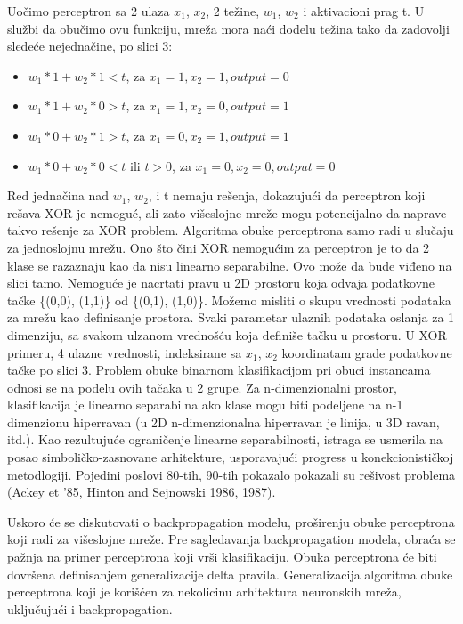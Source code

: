 \documentclass[fontsize=11bp, paper=a4]{scrarticle}
\begin{document}
Uočimo perceptron sa 2 ulaza $x_1$, $x_2$, 2 težine, $w_1$, $w_2$ i aktivacioni prag t. U službi da obučimo ovu funkciju, mreža mora naći dodelu težina tako da zadovolji sledeće nejednačine, po slici 3:
\begin{itemize}
    \item $w_1 * 1 + w_2 * 1 < t$, za $x_1 = 1, x_2 = 1, output = 0$
    \item $w_1 * 1 + w_2 * 0 > t$, za $x_1 = 1, x_2 = 0, output = 1$
    \item $w_1 * 0 + w_2 * 1 > t$, za $x_1 = 0, x_2 = 1, output = 1$
    \item $w_1 * 0 + w_2 * 0 < t$ ili $t > 0$, za $x_1 = 0, x_2 = 0, output = 0$
\end{itemize}
Red jednačina nad $w_1$, $w_2$, i  t nemaju rešenja, dokazujući da perceptron koji rešava XOR je nemoguć, ali zato višeslojne mreže mogu potencijalno da naprave takvo rešenje za XOR problem. Algoritma obuke perceptrona samo radi u slučaju za jednoslojnu mrežu. Ono što čini XOR nemogućim za perceptron je to da 2 klase se razaznaju kao da nisu linearno separabilne. Ovo može da bude viđeno na slici tamo. Nemoguće je nacrtati pravu u 2D prostoru koja odvaja podatkovne tačke \{(0,0), (1,1)\} od \{(0,1), (1,0)\}. Možemo misliti o skupu vrednosti podataka za mrežu kao definisanje prostora. Svaki parametar ulaznih podataka oslanja za 1 dimenziju, sa svakom ulzanom vrednošću koja definiše tačku u prostoru. U XOR primeru, 4 ulazne vrednosti, indeksirane sa $x_1$, $x_2$ koordinatam grade podatkovne tačke po slici 3. Problem obuke binarnom klasifikacijom pri obuci instancama odnosi se na podelu ovih tačaka u 2 grupe. Za n-dimenzionalni prostor, klasifikacija je linearno separabilna ako klase mogu biti podeljene na n-1 dimenzionu hiperravan (u 2D n-dimenzionalna hiperravan je linija, u 3D ravan, itd.). Kao rezultujuće ograničenje linearne separabilnosti, istraga se usmerila na posao simboličko-zasnovane arhitekture, usporavajući progress u konekcionističkoj metodlogiji. Pojedini poslovi 80-tih, 90-tih pokazalo pokazali su rešivost problema (Ackey et '85, Hinton and Sejnowski 1986, 1987).

Uskoro će se diskutovati o backpropagation modelu, proširenju obuke perceptrona koji radi za višeslojne mreže. Pre sagledavanja backpropagation modela, obraća se pažnja na primer perceptrona koji vrši klasifikaciju. Obuka perceptrona će biti dovršena definisanjem generalizacije delta pravila. Generalizacija algoritma obuke perceptrona koji je korišćen za nekolicinu arhitektura neuronskih mreža, uključujući i backpropagation.
\end{document}
